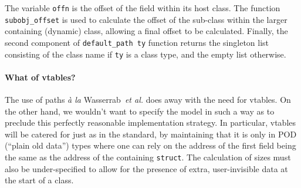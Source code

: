 \documentclass[11pt]{article}
\begin{document}
The variable \texttt{offn} is the offset of the field within its host
class.  The function \texttt{subobj_offset} is used to calculate the
offset of the sub-class within the larger containing (dynamic) class,
allowing a final offset to be calculated.  Finally, the second
component of \texttt{default_path~ty} function returns the singleton
list consisting of the class name if \texttt{ty} is a class type, and
the empty list otherwise.


%
\paragraph{What of vtables?}
The use of paths \emph{\`a la} Wasserrab~\emph{et al.} does away with
the need for vtables.  On the other hand, we wouldn't want to specify
the model in such a way as to preclude this perfectly reasonable
implementation strategy.  In particular, vtables will be catered for
just as in the standard, by maintaining that it is only in POD
(``plain old data'') types where one can rely on the address of the
first field being the same as the address of the containing
\texttt{struct}.  The calculation of sizes must also be
under-specified to allow for the presence of extra, user-invisible
data at the start of a class.
\end{document}
